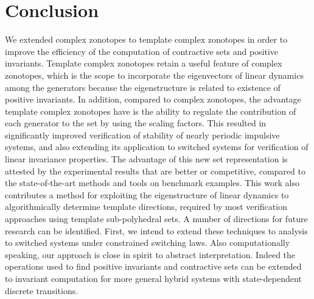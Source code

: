 \section{Conclusion}
\vspace{0em}
We extended complex zonotopes to template complex zonotopes in order to
improve the efficiency of the computation of contractive sets and
positive invariants.  Template complex zonotopes retain a useful feature of complex zonotopes, which is the scope to incorporate the
eigenvectors of linear dynamics among the generators because the
eigenstructure is related to existence of positive
invariants.  In addition, compared to complex zonotopes, the advantage
template complex zonotopes have is the ability to regulate the
contribution of each generator to the set by using the scaling factors.
This resulted in significantly improved verification of stability of
nearly periodic impulsive systems, and also extending its application
to switched systems for verification of linear invariance properties.
The advantage of this new set representation is attested
by the experimental results that are better or competitive, compared
to the state-of-the-art methods and tools on benchmark examples. This
work also contributes a method for exploiting the eigenstructure of
linear dynamics to algorithmically determine template directions,
required by most verification approaches using template sub-polyhedral
sets. A number of directions for future research can be
identified. First, we intend to extend these techniques to analysis to
switched systems under constrained switching laws. Also
computationally speaking, our approach is close in spirit to abstract
interpretation. Indeed the operations used to find positive invariants and contractive sets
can be extended to invariant computation for more general hybrid
systems with state-dependent discrete transitions.

